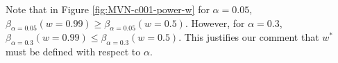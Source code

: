 \documentclass[11pt]{article} %
\begin{document}

Note that in Figure \ref{fig:MVN-c001-power-w} for $\alpha=0.05$, $\beta_{\alpha=0.05}(w=0.99)\geq\beta_{\alpha=0.05}(w=0.5)$. However, for $\alpha=0.3$, $\beta_{\alpha=0.3}(w=0.99)\leq\beta_{\alpha=0.3}(w=0.5)$. This justifies our comment that  $w^{*}$  must be defined with respect to $\alpha$.

\end{document}
